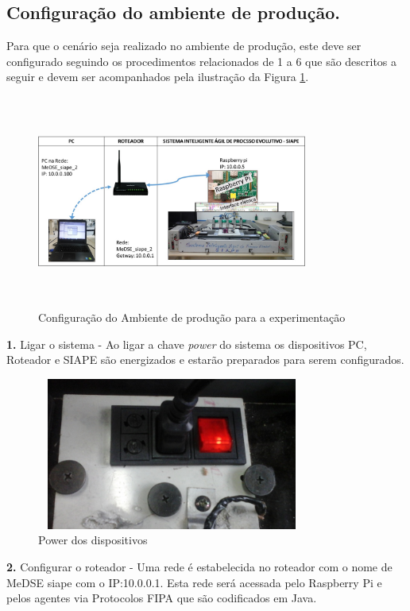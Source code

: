 \documentclass[10pt,letterpaper,twocolumn]{IEEEtran}
\begin{document}
\subsection{Configuração do ambiente de produção.}
Para que o cenário seja realizado no ambiente de produção, este deve ser configurado seguindo os procedimentos relacionados de 1 a 6 que são descritos a seguir e devem ser acompanhados pela ilustração da Figura \ref{F105}.\par 
\begin{figure}[!h]
	\centering
	\includegraphics[width=8.9cm, height=7cm]{MeDSE_imagens/F105_SIAPE_ESTUDOD_DE_CASO1.jpg} 
	\caption{Configuração do Ambiente de produção para a experimentação}
	\label{F105}
\end{figure}


\textbf{1.} Ligar o sistema -
Ao ligar a chave \textit{power} do sistema os dispositivos PC, Roteador e SIAPE são energizados e estarão preparados para serem configurados. 

\begin{figure}[!h]
	\centering
	\includegraphics[width=8.9cm, height=5cm]{MeDSE_imagens/F106_SIAPE_POWER.jpg} 
	\caption{Power dos dispositivos}
	\label{F106}
\end{figure}	


\textbf{2.} Configurar o roteador -
Uma rede é estabelecida no roteador com o nome de MeDSE siape com o IP:10.0.0.1. Esta rede será acessada pelo Raspberry Pi e pelos agentes via Protocolos FIPA que são codificados em Java. 
\end{document}
